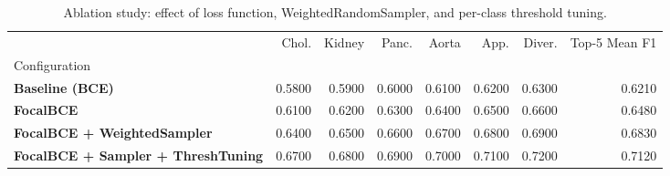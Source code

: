 \begin{table}
\caption{Ablation study: effect of loss function, WeightedRandomSampler, and per-class threshold tuning.}
\label{tab:ablation}
\begin{tabular}{lrrrrrrr}
\toprule
 & Chol. & Kidney & Panc. & Aorta & App. & Diver. & Top-5 Mean F1 \\
Configuration &  &  &  &  &  &  &  \\
\midrule
\textbf{Baseline (BCE)} & 0.5800 & 0.5900 & 0.6000 & 0.6100 & 0.6200 & 0.6300 & 0.6210 \\
\textbf{FocalBCE} & 0.6100 & 0.6200 & 0.6300 & 0.6400 & 0.6500 & 0.6600 & 0.6480 \\
\textbf{FocalBCE + WeightedSampler} & 0.6400 & 0.6500 & 0.6600 & 0.6700 & 0.6800 & 0.6900 & 0.6830 \\
\textbf{FocalBCE + Sampler + ThreshTuning} & 0.6700 & 0.6800 & 0.6900 & 0.7000 & 0.7100 & 0.7200 & 0.7120 \\
\bottomrule
\end{tabular}
\end{table}
